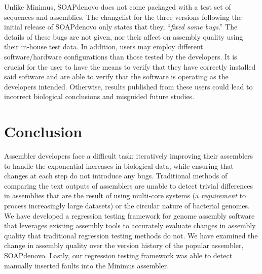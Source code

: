Unlike Minimus, SOAPdenovo does not come packaged with a test set of sequences and assemblies.
The changelist for the three versions following the initial release of SOAPdenovo only states that they, ``\emph{fixed some bugs}.''
The details of these bugs are not given, nor their affect on assembly quality using their in-house test data.
In addition, users may employ different software/hardware configurations than those tested by the developers.
It is crucial for the user to have the means to verify that they have correctly installed said software and are able to verify that the software is operating as the developers intended.
Otherwise, results published from these users could lead to incorrect biological conclusions and misguided future studies.







\section{Conclusion}
\label{conclusion}
Assembler developers face a difficult task: iteratively improving their assemblers to handle the exponential increases in biological data, while ensuring that changes at each step do not introduce any bugs.
Traditional methods of comparing the text outputs of assemblers are unable to detect trivial differences in assemblies that are the result of using multi-core systems (a \emph{requirement} to process increasingly large datasets) or the circular nature of bacterial genomes.
We have developed a regression testing framework for genome assembly software that leverages existing assembly tools to accurately evaluate changes in assembly quality that traditional regression testing methods do not.
We have examined the change in assembly quality over the version history of the popular assembler, SOAPdenovo.
Lastly, our regression testing framework was able to detect manually inserted faults into the Minimus assembler.

